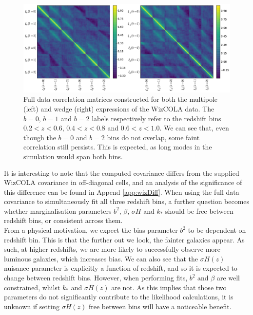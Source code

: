 \documentclass[titlesmallcaps, examinerscopy, copyrightpage]{uqthesis}
\begin{document}
\begin{figure}[h!]
  \begin{center}
    \includegraphics[width=\textwidth]{images/fullCorrelations.pdf}
  \end{center}
  \caption{Full data correlation matrices constructed for both the multipole (left) and wedge (right) expressions of the WizCOLA data. The $b=0$, $b=1$ and $b=2$ labels respectively refer to the redshift bins $0.2 < z < 0.6$, $0.4 < z < 0.8$ and $0.6 < z < 1.0$. We can see that, even though the $b=0$ and $b=2$ bins do not overlap, some faint correlation still persists. This is expected, as long modes in the simulation would span both bins.}
  \label{fig:fullCorrelations}
\end{figure}




It is interesting to note that the computed covariance differs from the supplied WizCOLA covariance in off-diagonal cells, and an analysis of the significance of this difference can be found in Append \ref{app:wizDiff}. When using the full data covariance to simultaneously fit all three redshift bins, a further question becomes whether marginalisation parameters $b^2$, $\beta$, $\sigma H$ and $k_*$ should be free between redshift bins, or consistent across them. \\

From a physical motivation, we expect the bias parameter $b^2$ to be dependent on redshift bin. This is that the further out we look, the fainter galaxies appear. As such, at higher redshifts, we are more likely to successfully observe more luminous galaxies, which increases bias. We can also see that the $\sigma H(z)$ nuisance parameter is explicitly a function of redshift, and so it is expected to change between redshift bins. However, when performing fits, $b^2$ and $\beta$ are well constrained, whilst $k_*$ and $\sigma H(z)$ are not. As this implies that those two parameters do not significantly contribute to the likelihood calculations, it is unknown if setting $\sigma H(z)$ free between bins will have a noticeable benefit. \\
\end{document}
